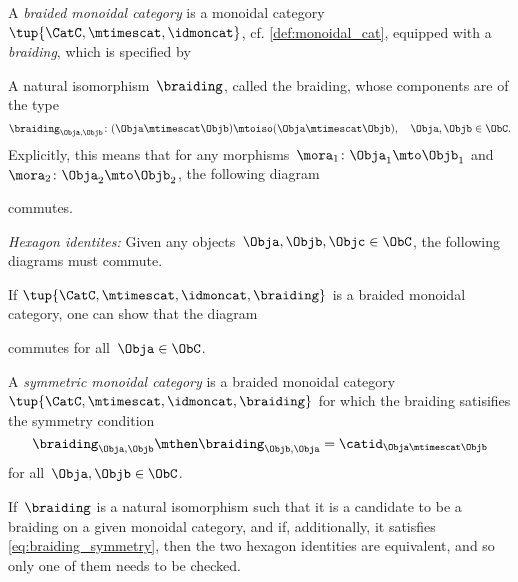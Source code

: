 \begin{ctdefinition}
  A \emph{braided monoidal category} is a monoidal category~$\tup{\CatC,\mtimescat,\idmoncat}$,  cf. \cref{def:monoidal_cat}, equipped with a \emph{braiding}, which is specified by
  
  \constit
   \begin{compactenum}
   \item A natural isomorphism~$\braiding$, called the braiding, whose components are of the type
   \begin{equation*}
   \braiding_{\Obja,\Objb}\colon (\Obja\mtimescat \Objb)\mtoiso (\Obja\mtimescat \Objb), \quad \Obja,\Objb \in \ObC.
\end{equation*}
   Explicitly, this means that for any morphisms~$\mora_1\colon \Obja_1\mto \Objb_1$ and~$\mora_2\colon \Obja_2\mto \Objb_2$, the following diagram
    \begin{center}
    \end{center}
    commutes. 
   \end{compactenum}
  
  \condit
  \begin{compactenum}
    \item \emph{Hexagon identites:} Given any objects~$\Obja,\Objb,\Objc\in \ObC$, the following diagrams must commute.
  \end{compactenum}
    \begin{center}
    \end{center}
    \begin{center}
    \end{center}
\end{ctdefinition}

 \begin{remark} If $\tup{\CatC,\mtimescat,\idmoncat, \braiding}$ is a braided monoidal category, one can show that the diagram 
    \begin{center}
    \end{center}
    commutes for all~$\Obja \in \ObC$.
  \end{remark}

\begin{ctdefinition}
    \label{def:sym-mon-cat}
  A \emph{symmetric monoidal category} is a braided monoidal category~$\tup{\CatC,\mtimescat,\idmoncat, \braiding}$ for which the braiding satisifies the symmetry condition
 \begin{equation}
     \label{eq:braiding-symmetry}
  \braiding_{\Obja,\Objb} \mthen \braiding_{\Objb,\Obja} = \catid_{\Obja \mtimescat \Objb}
\end{equation}
  for all~$\Obja, \Objb \in \ObC$.
  \end{ctdefinition}
  
  \begin{remark}
      If~$\braiding$ is a natural isomorphism such that it is a candidate to be a braiding on a given monoidal category, and if, additionally, it satisfies \cref{eq:braiding_symmetry}, then the two hexagon identities are equivalent, and so only one of them needs to be checked.
 \end{remark}